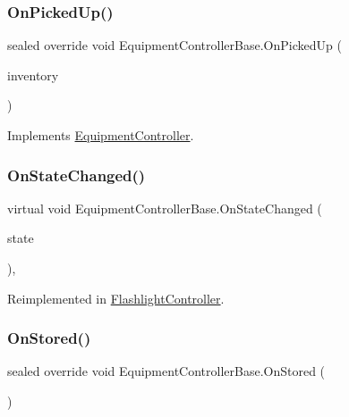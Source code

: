 \subsubsection{\texorpdfstring{On\+Picked\+Up()}{OnPickedUp()}}
{\footnotesize\ttfamily sealed override void Equipment\+Controller\+Base.\+On\+Picked\+Up (\begin{DoxyParamCaption}\item[{\mbox{\hyperlink{class_inventory}{Inventory}}}]{inventory }\end{DoxyParamCaption})\hspace{0.3cm}{\ttfamily [virtual]}}



Implements \mbox{\hyperlink{class_equipment_controller_a4e0b167b8b3365bb6711b19195143fb6}{Equipment\+Controller}}.

\mbox{\label{class_equipment_controller_base_a324ae128d6b938e23a6d1c4a33c370c4}} 
\subsubsection{\texorpdfstring{On\+State\+Changed()}{OnStateChanged()}}
{\footnotesize\ttfamily virtual void Equipment\+Controller\+Base.\+On\+State\+Changed (\begin{DoxyParamCaption}\item[{\mbox{\hyperlink{class_equipment_a8b3877398e5be5b420818b99ad7f0bca}{Equipment.\+Equipment\+State}}}]{state }\end{DoxyParamCaption})\hspace{0.3cm}{\ttfamily [protected]}, {\ttfamily [virtual]}}



Reimplemented in \mbox{\hyperlink{class_flashlight_controller_a80535a2da68630caac6deddcce5d388e}{Flashlight\+Controller}}.

\mbox{\label{class_equipment_controller_base_aa98a3869354632bcc5dfe5e9103ccaed}} 
\subsubsection{\texorpdfstring{On\+Stored()}{OnStored()}}
{\footnotesize\ttfamily sealed override void Equipment\+Controller\+Base.\+On\+Stored (\begin{DoxyParamCaption}{ }\end{DoxyParamCaption})\hspace{0.3cm}{\ttfamily [virtual]}}



